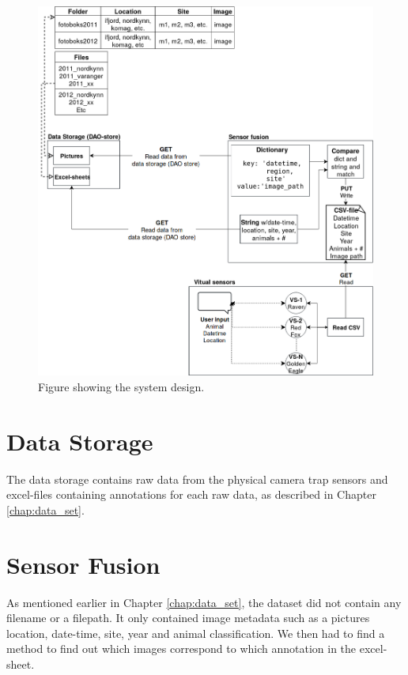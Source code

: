 \documentclass[USenglish]{uit-thesis}
\begin{document}
\begin{figure}
\centering
\includegraphics[width=\textwidth]{Design4.png}
\caption{Figure showing the system design.}
\label{fig:design}
\end{figure}

\section{Data Storage}

The data storage contains raw data from the physical camera trap sensors and excel-files containing annotations for each raw data, as described in Chapter \ref{chap:data_set}.


\section{Sensor Fusion} \label{sec:des_fused}
As mentioned earlier in Chapter \ref{chap:data_set}, the dataset did not contain any filename or a filepath. It only contained image metadata such as a pictures location, date-time, site, year and animal classification. We then had to find a method to find out which images correspond to which annotation in the excel-sheet.
\end{document}
